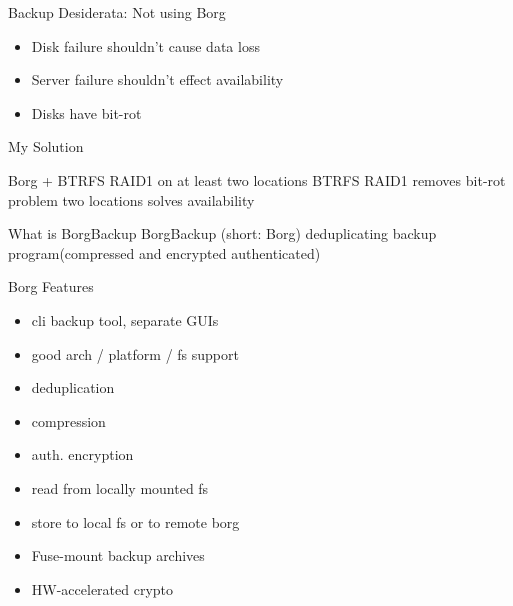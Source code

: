 \documentclass{beamer}
\begin{document}
\begin{frame}{Backup Desiderata: Not using Borg}
\begin{itemize}
	\item Disk failure shouldn't cause data loss
	\item Server failure shouldn't effect availability
	\item Disks have bit-rot
\end{itemize}
\end{frame}
\begin{frame}{My Solution}
\begin{center}
	Borg + BTRFS RAID1 on at least two locations  
	BTRFS RAID1 removes bit-rot problem  
	two locations solves availability 
\end{center}
\end{frame}

\begin{frame}{What is BorgBackup}
	BorgBackup (short: Borg) deduplicating backup program(compressed and encrypted authenticated)
\end{frame}

\begin{frame}{Borg Features}
	\begin{itemize}
	\item cli backup tool, separate GUIs

	\item good arch / platform / fs support

	\item deduplication 

	\item compression  

	\item auth. encryption

	\item read from locally mounted fs

	\item store to local fs or to remote borg
	
	\item Fuse-mount backup archives

	\item HW-accelerated crypto
\end{itemize}
\end{frame}
\end{document}
